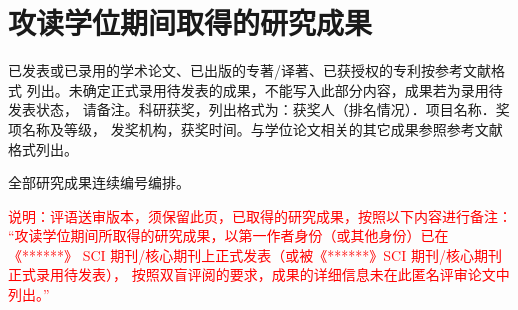 
\chapter{攻读学位期间取得的研究成果}
已发表或已录用的学术论文、已出版的专著/译著、已获授权的专利按参考文献格式 列出。未确定正式录用待发表的成果，不能写入此部分内容，成果若为录用待发表状态， 请备注。科研获奖，列出格式为：获奖人（排名情况）．项目名称．奖项名称及等级， 发奖机构，获奖时间。与学位论文相关的其它成果参照参考文献格式列出。

全部研究成果连续编号编排。

\textcolor{red}{
    说明：评语送审版本，须保留此页，已取得的研究成果，按照以下内容进行备注：
\\
    “攻读学位期间所取得的研究成果，以第一作者身份（或其他身份）已在《******》 SCI 期刊/核心期刊上正式发表（或被《******》SCI 期刊/核心期刊正式录用待发表）， 按照双盲评阅的要求，成果的详细信息未在此匿名评审论文中列出。”
}
